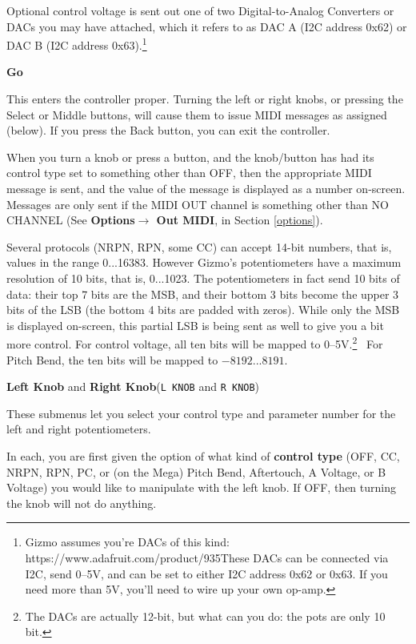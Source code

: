 \documentclass{article}
\begin{document}
Optional control voltage is sent out one of two Digital-to-Analog Converters or DACs you may have attached, which it refers to as DAC A (I2C address 0x62) or DAC B (I2C address 0x63).\footnote{Gizmo assumes you're DACs of this kind: https:/\!/www.adafruit.com/product/935\quad These DACs can be connected via I2C, send 0--5V, and can be set to either I2C address 0x62 or 0x63.  If you need more than 5V, you'll need to wire up your own op-amp.}

	\begin{description}

	\item{\bf Go}
	
	This enters the controller proper.  Turning the left or right knobs, or pressing the Select or Middle buttons, will cause them to issue MIDI messages as assigned (below).  If you press the Back button, you can exit the controller.
	
	When you turn a knob or press a button, and the knob/button has had its control type set to something other than OFF, then the appropriate MIDI message is sent, and the value of the message is displayed as a number on-screen.  Messages are only sent if the MIDI OUT channel is something other than NO CHANNEL (See {\bf Options\(\boldsymbol\rightarrow\) Out MIDI}, in Section \ref{options}).
	
	Several protocols (NRPN, RPN, some CC) can accept 14-bit numbers, that is, values in the range 0...16383.  However Gizmo's potentiometers have a maximum resolution of 10 bits, that is, 0...1023.   The potentiometers in fact send 10 bits of data: their top 7 bits are the MSB, and their bottom 3 bits become the upper 3 bits of the LSB (the bottom 4 bits are padded with zeros).   While only the MSB is displayed on-screen, this partial LSB is being sent as well to give you a bit more control.  For control voltage, all ten bits will be mapped to 0--5V.\footnote{The DACs are actually 12-bit, but what can you do: the pots are only 10 bit.}  \ For Pitch Bend, the ten bits will be mapped to \(-8192...8191\).

	\item{\bf Left Knob} and {\bf Right Knob}\quad (\texttt{L KNOB} and \texttt{R KNOB})
	
	These submenus let you select your control type and parameter number for the left and right potentiometers.
	
	In each, you are first given the option of what kind of {\bf control type} (OFF, CC, NRPN, RPN, PC, or (on the Mega) Pitch Bend, Aftertouch, A Voltage, or B Voltage) you would like to manipulate with the left knob.  If OFF, then turning the knob will not do anything.


\end{description}
\end{document}
